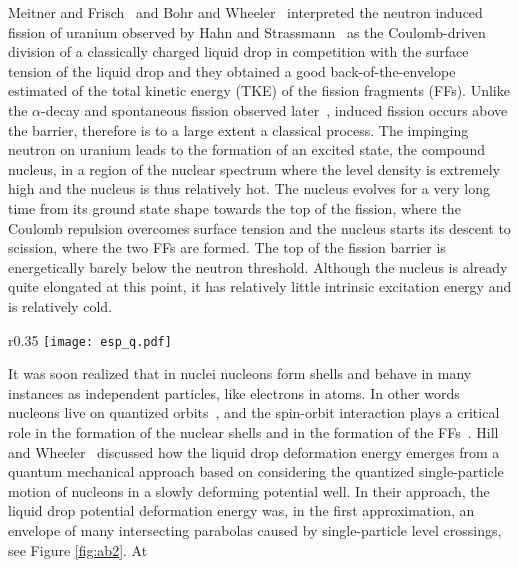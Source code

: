 \documentclass{webofc}
\begin{document}
Meitner and Frisch~\cite{Nature_1939r} and Bohr and Wheeler~\cite{Nature_1939r1,PhysRev_1939r}
interpreted the neutron induced fission of uranium observed
by Hahn and Strassmann~\cite{Natur_1939r} as the Coulomb-driven division of a classically charged liquid drop
in competition with the surface tension of the liquid drop and they
obtained a good back-of-the-envelope estimated of the total kinetic energy (TKE)
of the fission fragments (FFs). Unlike the $\alpha$-decay and spontaneous fission
observed later~\cite{Flerov},  induced fission occurs above the barrier, therefore is
to a large extent a classical process. The impinging neutron on uranium leads to
the formation of an excited state, the compound nucleus,
in a region of the nuclear spectrum where the level density is extremely high
and the nucleus is thus relatively hot.
The nucleus evolves for a very long time from its ground state shape towards the top of the fission,
where the Coulomb repulsion overcomes surface
tension and the nucleus starts its descent to scission, where the two FFs are formed.
The top of the fission barrier is energetically barely below the neutron threshold. Although
the nucleus is already quite elongated at this point, it has relatively little
intrinsic excitation energy and is relatively cold.
\begin{wrapfigure}{r}{0.35\textwidth}
\texttt{[image: esp\_q.pdf]}
\caption{ \label{fig:ab2}    The qualitative evolution of the single-particle levels (upper panel) and
of the total nuclear energy (lower panel) as a function of
nuclear deformation~\cite{PhysRev_1953r, Bertsch:1980}. The Fermi level is shown with a thick line.}
\end{wrapfigure}
It was soon realized that in nuclei nucleons form shells and behave
in many instances as independent particles, like electrons in atoms.
In other words nucleons live on quantized
orbits~\cite{Mayer,Jensen}, and the spin-orbit interaction plays
a critical role in the formation of the nuclear shells and in the formation of the FFs~\cite{Meitner}.  Hill and
Wheeler~\cite{PhysRev_1953r} discussed how the liquid drop deformation energy emerges from a quantum
mechanical approach based on considering the quantized single-particle
motion of nucleons in a slowly deforming potential well. In their approach, the liquid
drop potential deformation energy was, in the first
approximation, an envelope of many intersecting parabolas caused by
single-particle level crossings, see Figure \ref{fig:ab2}. At
\end{document}
